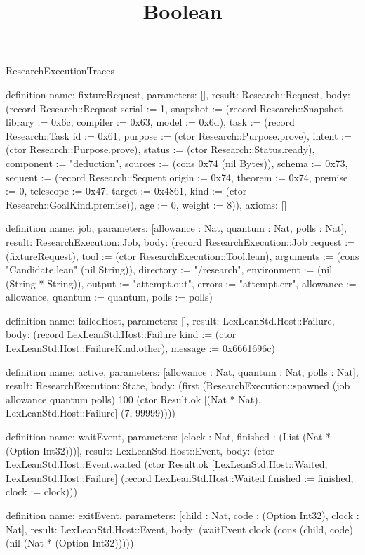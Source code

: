 \begin{lexlean}{ResearchExecutionTraces}
\title{Boolean}
\begin{semanticmodule}
definition{
  name: fixtureRequest,
  parameters: [],
  result: Research::Request,
  body: (record Research::Request {serial := 1, snapshot := (record Research::Snapshot {library := 0x6c, compiler := 0x63, model := 0x6d}), task := (record Research::Task {id := 0x61, purpose := (ctor Research::Purpose.prove), intent := (ctor Research::Purpose.prove), status := (ctor Research::Status.ready), component := "deduction", sources := (cons 0x74 (nil Bytes)), schema := 0x73, sequent := (record Research::Sequent {origin := 0x74, theorem := 0x74, premise := 0, telescope := 0x47, target := 0x4861, kind := (ctor Research::GoalKind.premise)}), age := 0, weight := 8})}),
  axioms: []
}

definition{
  name: job,
  parameters: [allowance : Nat, quantum : Nat, polls : Nat],
  result: ResearchExecution::Job,
  body: (record ResearchExecution::Job {request := (fixtureRequest), tool := (ctor ResearchExecution::Tool.lean), arguments := (cons "Candidate.lean" (nil String)), directory := "/research", environment := (nil (String * String)), output := "attempt.out", errors := "attempt.err", allowance := allowance, quantum := quantum, polls := polls})
}

definition{
  name: failedHost,
  parameters: [],
  result: LexLeanStd.Host::Failure,
  body: (record LexLeanStd.Host::Failure {kind := (ctor LexLeanStd.Host::FailureKind.other), message := 0x6661696c})
}

definition{
  name: active,
  parameters: [allowance : Nat, quantum : Nat, polls : Nat],
  result: ResearchExecution::State,
  body: (first (ResearchExecution::spawned (job allowance quantum polls) 100 (ctor Result.ok [(Nat * Nat), LexLeanStd.Host::Failure] (7, 99999))))
}

definition{
  name: waitEvent,
  parameters: [clock : Nat, finished : (List (Nat * (Option Int32)))],
  result: LexLeanStd.Host::Event,
  body: (ctor LexLeanStd.Host::Event.waited (ctor Result.ok [LexLeanStd.Host::Waited, LexLeanStd.Host::Failure] (record LexLeanStd.Host::Waited {finished := finished, clock := clock})))
}

definition{
  name: exitEvent,
  parameters: [child : Nat, code : (Option Int32), clock : Nat],
  result: LexLeanStd.Host::Event,
  body: (waitEvent clock (cons (child, code) (nil (Nat * (Option Int32)))))
}


\end{semanticmodule}
\end{lexlean}
